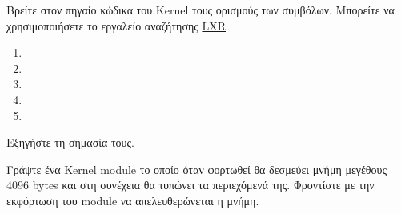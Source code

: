\documentclass[18pt]{extarticle}
\begin{document}
\begin{question}
    Βρείτε στον πηγαίο κώδικα του Kernel τους ορισμούς των συμβόλων. Μπορείτε να χρησιμοποιήσετε το εργαλείο αναζήτησης \href{https://elixir.bootlin.com/linux/latest/source}{LXR}
    \begin{enumerate}
        \item {}
        \item {}
        \item {}
        \item {}
        \item {}
    \end{enumerate}
   Εξηγήστε τη σημασία τους. 
\end{question}

\begin{question}
   Γράψτε ένα Kernel module το οποίο όταν φορτωθεί θα δεσμεύει μνήμη μεγέθους 4096 bytes
   και στη συνέχεια θα τυπώνει τα περιεχόμενά της.
   Φροντίστε με την εκφόρτωση του module να απελευθερώνεται η μνήμη.
\end{question}
\end{document}
